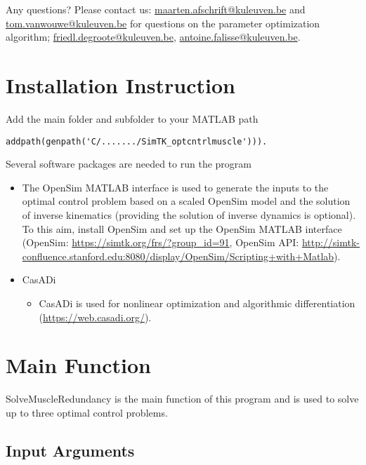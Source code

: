 \documentclass[a4paper,oneside,11pt]{article}
\begin{document}
Any questions? Please contact us:
\href{maarten.afschrift@kuleuven.be}{maarten.afschrift@kuleuven.be} and \href{tom.vanwouwe@kuleuven.be}{tom.vanwouwe@kuleuven.be} for questions on the parameter optimization algorithm;  \href{friedl.degroote@kuleuven.be}{friedl.degroote@kuleuven.be},  \href{antoine.falisse@kuleuven.be}{antoine.falisse@kuleuven.be}.



\section{Installation Instruction}

Add the main folder and subfolder to your MATLAB path 
\begin{lstlisting}
addpath(genpath('C/......./SimTK_optcntrlmuscle'))).
\end{lstlisting}

Several software packages are needed to run the program
\begin{itemize}
	\item The OpenSim MATLAB interface is used to generate the inputs to the optimal control problem based on a scaled OpenSim model and the solution of inverse kinematics (providing the solution of inverse dynamics is optional). To this aim, install OpenSim and set up the OpenSim MATLAB interface (OpenSim: \url{https://simtk.org/frs/?group_id=91}, OpenSim API: \url{http://simtk-confluence.stanford.edu:8080/display/OpenSim/Scripting+with+Matlab}).
	\item CasADi
	\begin{itemize}
	\item CasADi is used for nonlinear optimization and algorithmic differentiation (\url{https://web.casadi.org/}).
	\end{itemize}
\end{itemize}

\section{Main Function}

SolveMuscleRedundancy is the main function of this program and is used to solve up to three optimal control problems. 


\subsection{Input Arguments}
\end{document}
